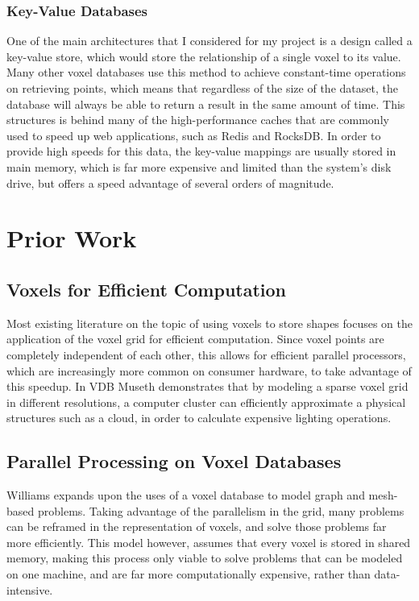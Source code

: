 \documentclass[10pt,twocolumn]{article}
\begin{document}
\subsubsection{Key-Value Databases}

One of the main architectures that I considered for my project is a design
called a key-value store\cite{kvdatabase}, which would store the relationship of
a single voxel to its value. Many other voxel databases use this method to
achieve constant-time operations on retrieving points, which means that
regardless of the size of the dataset, the database will always be able to
return a result in the same amount of time. This structures is behind many of
the high-performance caches that are commonly used to speed up web applications,
such as Redis and RocksDB\cite{dong2021rocksdb}. In order to provide high speeds
for this data, the key-value mappings are usually stored in main memory, which
is far more expensive and limited than the system's disk drive, but offers
a speed advantage of several orders of magnitude\cite{latencyKnow}.

\section{Prior Work}

\subsection{Voxels for Efficient Computation}

Most existing literature on the topic of using voxels to store shapes focuses on
the application of the voxel grid for efficient computation. Since voxel points
are completely independent of each other, this allows for efficient parallel
processors, which are increasingly more common on consumer hardware, to take
advantage of this speedup. In VDB\cite{museth2013vdb} Museth demonstrates that
by modeling a sparse voxel grid in different resolutions, a computer cluster can
efficiently approximate a physical structures such as a cloud, in order to
calculate expensive lighting operations.

\subsection{Parallel Processing on Voxel Databases}

Williams\cite{williams1992voxel} expands upon the uses of a voxel database to
model graph and mesh-based problems. Taking advantage of the parallelism in the
grid, many problems can be reframed in the representation of voxels, and solve
those problems far more efficiently. This model however, assumes that every
voxel is stored in shared memory, making this process only viable to solve
problems that can be modeled on one machine, and are far more computationally
expensive, rather than data-intensive.
\end{document}
